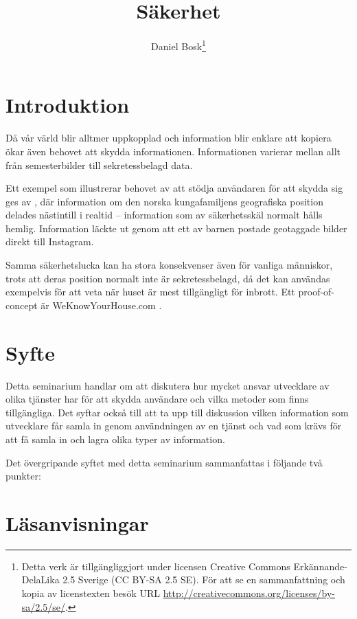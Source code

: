 \documentclass[a4paper,nocourse]{miunasgn}
\title{Säkerhet}
\author{Daniel Bosk\footnote{%
	Detta verk är tillgängliggjort under licensen Creative Commons 
	Erkännande-DelaLika 2.5 Sverige (CC BY-SA 2.5 SE).
	För att se en sammanfattning och kopia av licenstexten besök URL 
	\url{http://creativecommons.org/licenses/by-sa/2.5/se/}.
}}
\date{\svnId}
\begin{document}
\maketitle
\thispagestyle{foot}
\tableofcontents


\section{Introduktion}
\label{sec:Introduktion}
\noindent
Då vår värld blir alltmer uppkopplad och information blir enklare att kopiera 
ökar även behovet att skydda informationen.
Informationen varierar mellan allt från semesterbilder till sekretessbelagd 
data.

Ett exempel som illustrerar behovet av att stödja användaren för att skydda sig 
ges av \citet{Roberts2012wia}, där information om den norska kungafamiljens 
geografiska position delades nästintill i realtid -- information som av 
säkerhetsskäl normalt hålls hemlig.
Information läckte ut genom att ett av barnen postade geotaggade bilder direkt 
till Instagram.

Samma säkerhetslucka kan ha stora konsekvenser även för vanliga människor, 
trots att deras position normalt inte är sekretessbelagd, då det kan användas 
exempelvis för att veta när huset är mest tillgängligt för inbrott.
Ett proof-of-concept är WeKnowYourHouse.com \citep{Brading2012tpl}.


\section{Syfte}
\label{sec:Syfte}
\noindent
Detta seminarium handlar om att diskutera hur mycket ansvar utvecklare av olika 
tjänster har för att skydda användare och vilka metoder som finns tillgängliga.
Det syftar också till att ta upp till diskussion vilken information som 
utvecklare får samla in genom användningen av en tjänst och vad som krävs för 
att få samla in och lagra olika typer av information.

Det övergripande syftet med detta seminarium sammanfattas i följande två 
punkter:
\begin{itemize}
	
\end{itemize}


\section{Läsanvisningar}
\label{sec:Lasanvisningar}
\noindent

\end{document}
